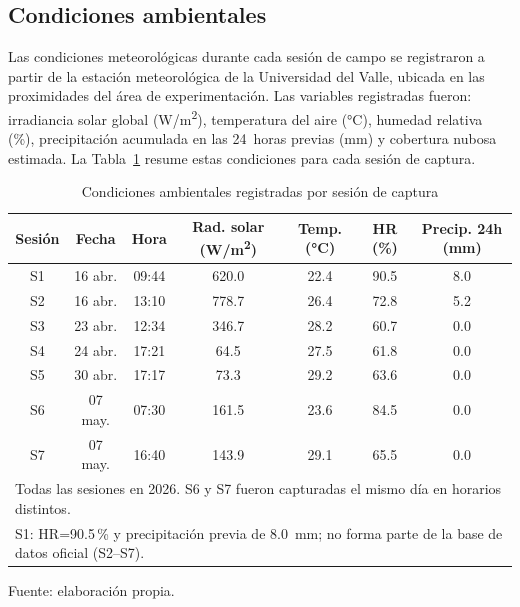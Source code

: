 \subsection{Condiciones ambientales}

Las condiciones meteorológicas durante cada sesión de campo se registraron
a partir de la estación meteorológica de la Universidad del Valle, ubicada
en las proximidades del área de experimentación. Las variables registradas
fueron: irradiancia solar global (\si{W/m^2}), temperatura del aire
(\si{\celsius}), humedad relativa (\%), precipitación acumulada en las
24~horas previas (\si{mm}) y cobertura nubosa estimada. La
Tabla~\ref{tab:condiciones_ambientales} resume estas condiciones para cada
sesión de captura.

\begin{table}[H]
\centering
\caption{Condiciones ambientales registradas por sesión de captura}
\label{tab:condiciones_ambientales}
\begin{tabular}{ccccccc}
\toprule
\textbf{Sesión} & \textbf{Fecha} & \textbf{Hora} & \textbf{Rad. solar (\si{W/m^2})} &
\textbf{Temp. (\si{\celsius})} & \textbf{HR (\%)} & \textbf{Precip. 24h (\si{mm})} \\
\midrule
S1            & 16 abr. & 09:44 & 620.0 & 22.4 & 90.5 & 8.0 \\
S2            & 16 abr. & 13:10 & 778.7 & 26.4 & 72.8 & 5.2 \\
S3            & 23 abr. & 12:34 & 346.7 & 28.2 & 60.7 & 0.0 \\
S4            & 24 abr. & 17:21 &  64.5 & 27.5 & 61.8 & 0.0 \\
S5            & 30 abr. & 17:17 &  73.3 & 29.2 & 63.6 & 0.0 \\
S6            & 07 may. & 07:30 & 161.5 & 23.6 & 84.5 & 0.0 \\
S7            & 07 may. & 16:40 & 143.9 & 29.1 & 65.5 & 0.0 \\
\bottomrule
\multicolumn{7}{l}{\small Todas las sesiones en 2026. S6 y S7 fueron capturadas el mismo día en horarios distintos.} \\
\multicolumn{7}{l}{\small S1: HR=90.5\,\% y precipitación previa de 8.0~mm; no forma parte de la base de datos oficial (S2--S7).}
\end{tabular}

  {\footnotesize Fuente: elaboración propia.}
\end{table}

